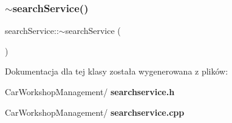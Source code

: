 \subsubsection{$\sim$searchService()}
{\footnotesize\ttfamily search\+Service\+::$\sim$search\+Service (\begin{DoxyParamCaption}{ }\end{DoxyParamCaption})}



Dokumentacja dla tej klasy została wygenerowana z plików\+:\begin{DoxyCompactItemize}
\item 
Car\+Workshop\+Management/\textbf{ searchservice.\+h}\item 
Car\+Workshop\+Management/\textbf{ searchservice.\+cpp}\end{DoxyCompactItemize}
